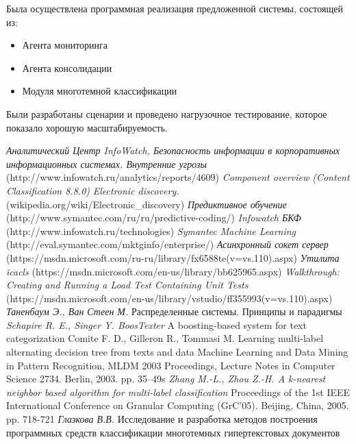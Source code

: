 \documentclass[russian, utf8, emptystyle]{eskdtext}
\begin{document}
Была осуществлена программная реализация предложенной системы, состоящей из:
\begin{itemize}
	\item Агента мониторинга
	\item Агента консолидации
	\item Модуля многотемной классификации
\end{itemize}

Были разработаны сценарии и проведено нагрузочное тестирование, которое показало хорошую масштабируемость.

\begin{thebibliography}{50}
	\textit {Аналитический Центр InfoWatch, Безопасность информации в корпоративных информационных системах. Внутренние угрозы}
	{(http://www.infowatch.ru/analytics/reports/4609)}
	\textit {Component overview (Content Classification 8.8.0)}
	\textit{Electronic discovery.}
	{(wikipedia.org/wiki/Electronic\_discovery)}
	\textit {Предиктивное обучение}
	{(http://www.symantec.com/ru/ru/predictive-coding/)}
	\textit {Infowatch БКФ }
	{(http://www.infowatch.ru/technologies)}
	\textit {Symantec Machine Learning}
	{(http://eval.symantec.com/mktginfo/enterprise/)}
	\textit{Асинхронный сокет сервер}
	{(https://msdn.microsoft.com/ru-ru/library/fx6588te(v=vs.110).aspx)}
	\textit{Утилита icacls}
	{(https://msdn.microsoft.com/en-us/library/bb625965.aspx)}
	\textit{Walkthrough: Creating and Running a Load Test Containing Unit Tests}
	{(https://msdn.microsoft.com/en-us/library/vstudio/ff355993(v=vs.110).aspx)}
	\textit{Таненбаум Э., Ван Стеен М.}
	{Распределенные системы. Принципы и парадигмы}
	\textit{Schapire R. E., Singer Y. BoosTexter}
	{A boosting-based system for text categorization}
	{Comite F. D., Gilleron R., Tommasi M. Learning multi-label alternating decision tree from texts and data}
	{Machine Learning and Data Mining in Pattern Recognition, MLDM 2003 Proceedings, Lecture Notes in Computer Science 2734. Berlin, 2003. pp. 35–49s}
	\textit{Zhang M.-L., Zhou Z.-H. A k-nearest neighbor based algorithm for multi-label classification }
	{Proceedings of the 1st IEEE International Conference on Granular Computing (GrC'05). Beijing, China, 2005. pp. 718-721}
	\textit{Глазкова В.В.}
	{Исследование и разработка методов построения программных средств классификации многотемных гипертекстовых документов}
\end{thebibliography}
\end{document}
